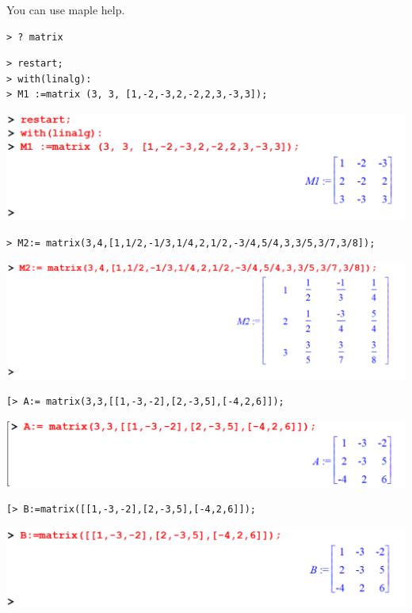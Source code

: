 \documentclass[
]{book}
\theoremstyle{definition}
\theoremstyle{definition}
\theoremstyle{definition}
\theoremstyle{definition}
\theoremstyle{remark}
\begin{document}
You can use maple help.

\begin{verbatim}
> ? matrix
\end{verbatim}

\begin{verbatim}
> restart;
> with(linalg):
> M1 :=matrix (3, 3, [1,-2,-3,2,-2,2,3,-3,3]);
\end{verbatim}

\includegraphics{figures/Lesson 4/fig1.png}

\begin{verbatim}
> M2:= matrix(3,4,[1,1/2,-1/3,1/4,2,1/2,-3/4,5/4,3,3/5,3/7,3/8]);
\end{verbatim}

\includegraphics{figures/Lesson 4/fig2.png}

\begin{verbatim}
[> A:= matrix(3,3,[[1,-3,-2],[2,-3,5],[-4,2,6]]);
\end{verbatim}

\includegraphics{figures/Lesson 4/fig3.png}

\begin{verbatim}
[> B:=matrix([[1,-3,-2],[2,-3,5],[-4,2,6]]);
\end{verbatim}

\includegraphics{figures/Lesson 4/fig4.png}
\end{document}
